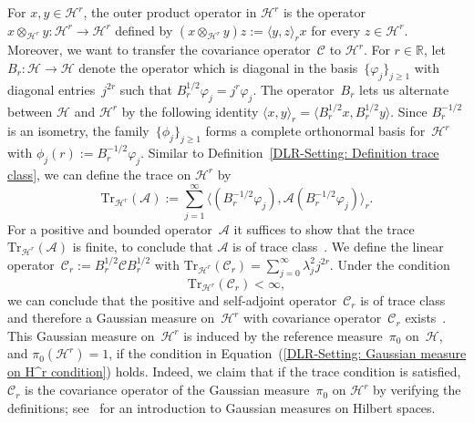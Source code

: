 For $x,y \in \mathcal{H}^r$, the outer product operator in $\mathcal{H}^r$ is the operator~$ x \otimes_{\mathcal{H}^r} y : \mathcal{H}^r \to \mathcal{H}^r $ defined by $ (x \otimes_{\mathcal{H}^r} y) z := \langle y, z \rangle_r x $ for every $ z \in \mathcal{H}^r$. Moreover, we want to transfer the covariance operator~$\mathcal{C}$ to $\mathcal{H}^r$. For $r \in \mathbb{R}$, let $B_r: \mathcal{H} \to \mathcal{H}$ denote the operator which is diagonal in the basis~$\{ \varphi_j \}_{j \geq 1}$ with diagonal entries~$j^{2r}$ such that $B_r^{1/2} \varphi_j = j^{r} \varphi_j$. The operator~$B_r$ lets us alternate between $\mathcal{H}$ and $\mathcal{H}^r$ by the following identity $ \langle x, y \rangle_r = \langle B_r^{1/2} x, B_r^{1/2} y \rangle$. Since $B_r^{-1/2} $ is an isometry, the family~$\{ \phi_j \}_{j \geq 1}$ forms a complete orthonormal basis for~$\mathcal{H}^r$ with $ \phi_j(r) := B_r^{-1/2} \varphi_j$. Similar to Definition~\ref{DLR-Setting: Definition trace class}, we can define the trace on $\mathcal{H}^r$ by
\begin{equation}
 \label{DLR-Setting: Trace on H^s}
 \text{Tr}_{\mathcal{H}^r}(\mathcal{A}) := \sum_{j=1}^{\infty} \langle (B_r^{-1/2}\varphi_j ), \mathcal{A}( B_r^{-1/2}\varphi_j) \rangle_r.
\end{equation}
For a positive and bounded operator~$\mathcal{A}$ it suffices to show that the trace~$\text{Tr}_{\mathcal{H}^r}(\mathcal{A})$ is finite, to conclude that $\mathcal{A}$ is of trace class~\autocite[Proposition C.3]{DaPrato1992}. We define the linear operator~$\mathcal{C}_r := B_r^{1/2} \mathcal{C} B_r^{1/2} $ with $ \text{Tr}_{\mathcal{H}^r}(\mathcal{C}_r) = \sum_{j=0}^{\infty} \lambda_j^2 j^{2r}$. Under the condition
\begin{equation}
\label{DLR-Setting: Gaussian measure on H^r condition}
 \text{Tr}_{\mathcal{H}^r}(\mathcal{C}_r) < \infty,
\end{equation}
we can conclude that the positive and self-adjoint operator~$\mathcal{C}_r$ is of trace class and therefore a Gaussian measure on~$\mathcal{H}^r$ with covariance operator~$\mathcal{C}_r$ exists~\autocite[Proposition 2.18]{DaPrato1992}. This Gaussian measure on~$\mathcal{H}^r$ is induced by the reference measure~$\pi_0$ on~$\mathcal{H}$, and $ \pi_0(\mathcal{H}^r ) =1$, if the condition in Equation~(\ref{DLR-Setting: Gaussian measure on H^r condition}) holds. Indeed, we claim that if the trace condition is satisfied, $\mathcal{C}_r$ is the covariance operator of the Gaussian measure~$\pi_0$ on $\mathcal{H}^r$ by verifying the definitions; see~\autocite[Chapter 2.3]{DaPrato1992} for an introduction to Gaussian measures on Hilbert spaces.

